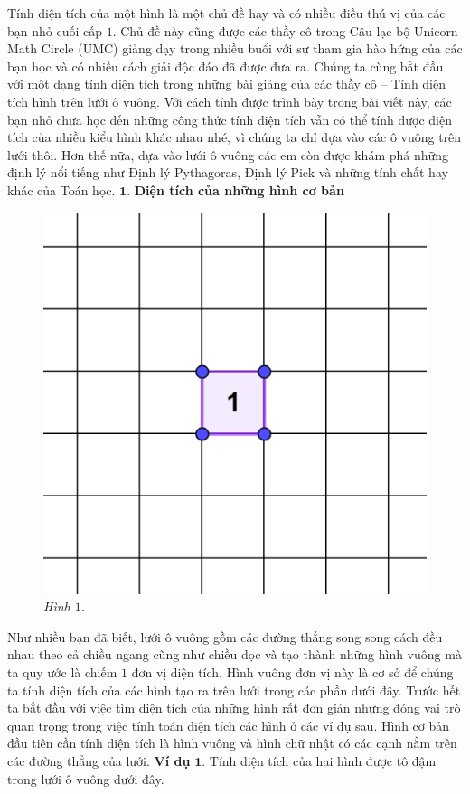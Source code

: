 \begin{multicols}{2}
	Tính diện tích của một hình là một chủ đề hay và có nhiều điều thú vị của các bạn nhỏ cuối cấp $1$. Chủ đề này cũng được các thầy cô trong Câu lạc bộ Unicorn Math Circle (UMC) giảng dạy trong nhiều buổi với sự tham gia hào hứng của các bạn học và có nhiều cách giải độc đáo đã được đưa ra. Chúng ta cùng bắt đầu với một dạng tính diện tích trong những bài giảng của các thầy cô -- Tính diện tích hình trên lưới ô vuông. Với cách tính được trình bày trong bài viết này, các bạn nhỏ chưa học đến những công thức tính diện tích vẫn có thể tính được diện tích của nhiều kiểu hình khác nhau nhé, vì chúng ta chỉ dựa vào các ô vuông trên lưới thôi. Hơn thế nữa, dựa vào lưới ô vuông các em còn được khám phá những định lý nổi tiếng như Định lý Pythagoras, Định lý Pick và những tính chất hay khác của Toán học.
	\vskip 0.1cm
	$\pmb{1.}$ \textbf{\color{toancuabi}Diện tích của những hình cơ bản}
	\begin{figure}[H]
			\centering
			\vspace*{-5pt}
			\captionsetup{labelformat= empty, justification=centering}
			\includegraphics[width=0.45\linewidth]{1}
			\caption{\small\textit{\color{toancuabi}Hình $1$.}}
			\vspace*{-10pt}
		\end{figure}
	Như nhiều bạn đã biết, lưới ô vuông gồm các đường thẳng song song cách đều nhau theo cả chiều ngang cũng như chiều dọc và tạo thành những hình vuông mà ta quy ước là chiếm $1$ đơn vị diện tích. Hình vuông đơn vị này là cơ sở để chúng ta tính diện tích của các hình tạo ra trên lưới trong các phần dưới đây.
	\vskip 0.1cm
	Trước hết ta bắt đầu với việc tìm diện tích của những hình rất đơn giản nhưng đóng vai trò quan trọng trong việc tính toán diện tích các hình ở các ví dụ sau.
	\vskip 0.1cm
	Hình cơ bản đầu tiên cần tính diện tích là hình vuông và hình chữ nhật có các cạnh nằm trên các đường thẳng của lưới.
	\vskip 0.1cm
	\textbf{\color{toancuabi}Ví dụ} $\pmb{1.}$ Tính diện tích của hai hình được tô đậm trong lưới ô vuông dưới đây.  

\end{multicols}
